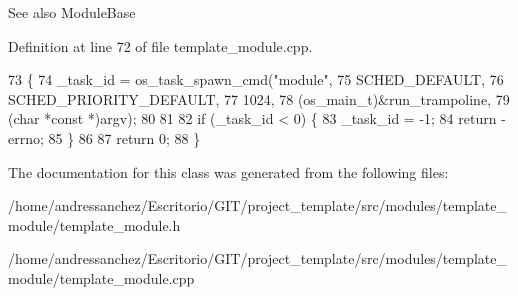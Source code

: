 \begin{DoxySeeAlso}{See also}
Module\+Base 
\end{DoxySeeAlso}


Definition at line 72 of file template\+\_\+module.\+cpp.


\begin{DoxyCode}
73 \{
74     \_task\_id = os\_task\_spawn\_cmd(\textcolor{stringliteral}{"module"},
75                       SCHED\_DEFAULT,
76                       SCHED\_PRIORITY\_DEFAULT,
77                       1024,
78                       (os\_main\_t)&run\_trampoline,
79                       (\textcolor{keywordtype}{char} *\textcolor{keyword}{const} *)argv);
80     
81 
82     \textcolor{keywordflow}{if} (\_task\_id < 0) \{
83         \_task\_id = -1;
84         \textcolor{keywordflow}{return} -errno;
85     \}
86 
87     \textcolor{keywordflow}{return} 0;
88 \}
\end{DoxyCode}


The documentation for this class was generated from the following files\+:\begin{DoxyCompactItemize}
\item 
/home/andressanchez/\+Escritorio/\+G\+I\+T/project\+\_\+template/src/modules/template\+\_\+module/template\+\_\+module.\+h\item 
/home/andressanchez/\+Escritorio/\+G\+I\+T/project\+\_\+template/src/modules/template\+\_\+module/template\+\_\+module.\+cpp\end{DoxyCompactItemize}

